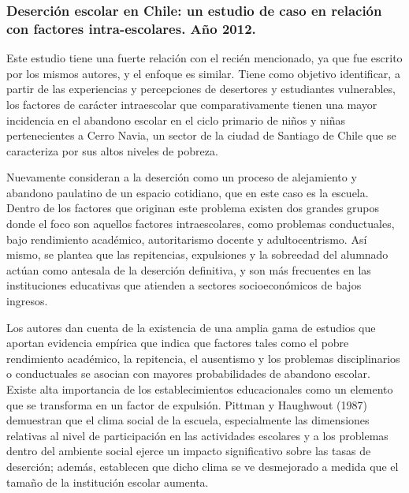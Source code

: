 \subsubsection{Deserción escolar en Chile: un estudio de caso en relación con factores intra-escolares. Año 2012.}
Este estudio tiene una fuerte relación con el recién mencionado, ya que fue escrito por los mismos autores, y el enfoque es similar. Tiene como objetivo identificar, a partir de las experiencias y percepciones de desertores y estudiantes vulnerables, los factores de carácter intraescolar que comparativamente tienen una mayor incidencia en el abandono escolar en el ciclo primario de niños y niñas pertenecientes a Cerro Navia, un sector de la ciudad de Santiago de Chile que se caracteriza por sus altos niveles de pobreza. 

Nuevamente consideran a la deserción como un proceso de alejamiento y abandono paulatino de un espacio cotidiano, que en este caso es la escuela. Dentro de los factores que originan este problema existen dos grandes grupos donde el foco son aquellos factores intraescolares, como problemas conductuales, bajo rendimiento académico, autoritarismo docente y adultocentrismo. Así mismo, se plantea que las repitencias, expulsiones y la sobreedad del alumnado actúan como antesala de la deserción definitiva, y son más frecuentes en las instituciones educativas que atienden a sectores socioeconómicos de bajos ingresos. 

Los autores dan cuenta de la existencia de una amplia gama de estudios que aportan evidencia empírica que indica que factores tales como el pobre rendimiento académico, la repitencia, el ausentismo y los problemas disciplinarios o conductuales se asocian con mayores probabilidades de abandono escolar. Existe alta importancia de los establecimientos educacionales como un elemento que se transforma en un factor de expulsión. Pittman y Haughwout (1987) demuestran que el clima social de la escuela, especialmente las dimensiones relativas al nivel de participación en las actividades escolares y a los problemas dentro del ambiente social ejerce un impacto significativo sobre las tasas de deserción; además, establecen que dicho clima se ve desmejorado a medida que el tamaño de la institución escolar aumenta. 


